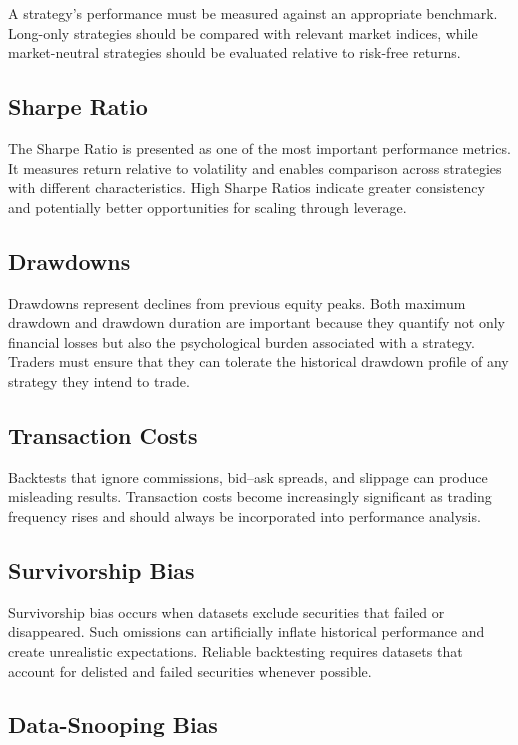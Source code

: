\documentclass[11pt]{article}
\begin{document}
A strategy's performance must be measured against an appropriate benchmark. Long-only strategies should be compared with relevant market indices, while market-neutral strategies should be evaluated relative to risk-free returns.

\subsection{Sharpe Ratio}

The Sharpe Ratio is presented as one of the most important performance metrics. It measures return relative to volatility and enables comparison across strategies with different characteristics. High Sharpe Ratios indicate greater consistency and potentially better opportunities for scaling through leverage.

\subsection{Drawdowns}

Drawdowns represent declines from previous equity peaks. Both maximum drawdown and drawdown duration are important because they quantify not only financial losses but also the psychological burden associated with a strategy. Traders must ensure that they can tolerate the historical drawdown profile of any strategy they intend to trade.

\subsection{Transaction Costs}

Backtests that ignore commissions, bid--ask spreads, and slippage can produce misleading results. Transaction costs become increasingly significant as trading frequency rises and should always be incorporated into performance analysis.

\subsection{Survivorship Bias}

Survivorship bias occurs when datasets exclude securities that failed or disappeared. Such omissions can artificially inflate historical performance and create unrealistic expectations. Reliable backtesting requires datasets that account for delisted and failed securities whenever possible.

\subsection{Data-Snooping Bias}
\end{document}

